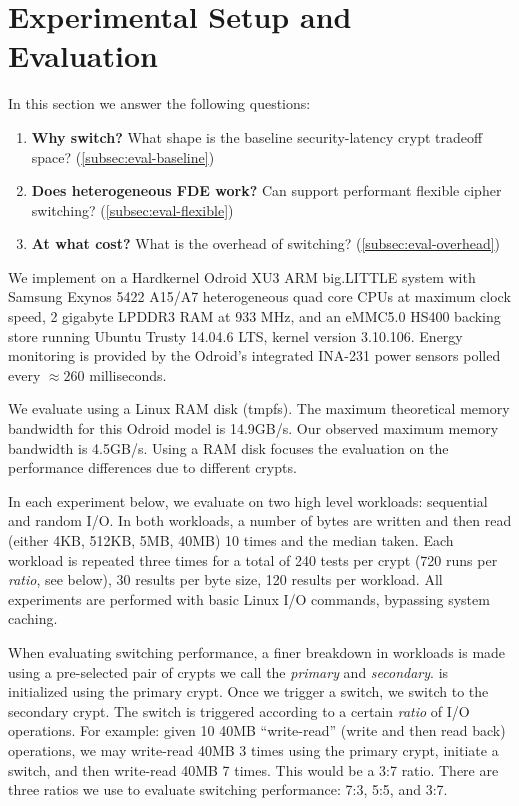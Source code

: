 \section{Experimental Setup and Evaluation}\label{sec:eval}

In this section we answer the following questions:

\begin{enumerate}
 \item {\bf Why switch?} What shape is the baseline security-latency crypt
 tradeoff space? (\cref{subsec:eval-baseline})
 \item {\bf Does heterogeneous FDE work?} Can \sys support performant flexible
 cipher switching? (\cref{subsec:eval-flexible})
 \item {\bf At what cost?} What is the overhead of switching?
 (\cref{subsec:eval-overhead})
\end{enumerate}

 We implement \sys on a Hardkernel Odroid XU3 ARM
big.LITTLE system with Samsung Exynos 5422 A15/A7 heterogeneous quad core CPUs at maximum clock speed, 2 gigabyte LPDDR3 RAM at 933 MHz, and an
eMMC5.0 HS400 backing store running Ubuntu Trusty 14.04.6 LTS, kernel version
3.10.106. Energy monitoring is provided by the Odroid's integrated INA-231
power sensors polled every $\approx{260}$ milliseconds.

We evaluate \sys using a Linux RAM disk (tmpfs). The maximum theoretical memory
bandwidth for this Odroid model is 14.9GB/s\@. Our observed maximum memory
bandwidth is 4.5GB/s. Using a RAM disk focuses the evaluation on the performance
differences due to different crypts.

 In each experiment below, we evaluate \sys on two high
level workloads: sequential and random I/O. In both workloads, a number of bytes
are written and then read (either 4KB, 512KB, 5MB, 40MB) 10 times and the median
taken. Each workload is repeated three times for a total of 240 tests per crypt
(720 runs per {\em ratio}, see below), 30 results per byte size, 120 results per
workload. All experiments are performed with basic Linux I/O commands, bypassing
system caching.

When evaluating switching performance, a finer breakdown in workloads is made
using a pre-selected pair of crypts we call the {\em primary} and {\em
secondary}. \sys is initialized using the primary crypt. Once we trigger a
switch, we switch to the secondary crypt. The switch is triggered according to a
certain {\em ratio} of I/O operations. For example: given 10 40MB ``write-read''
(write and then read back) operations, we may write-read 40MB 3 times using the
primary crypt, initiate a switch, and then write-read 40MB 7 times. This would
be a 3:7 ratio. There are three ratios we use to evaluate switching performance:
7:3, 5:5, and 3:7.



